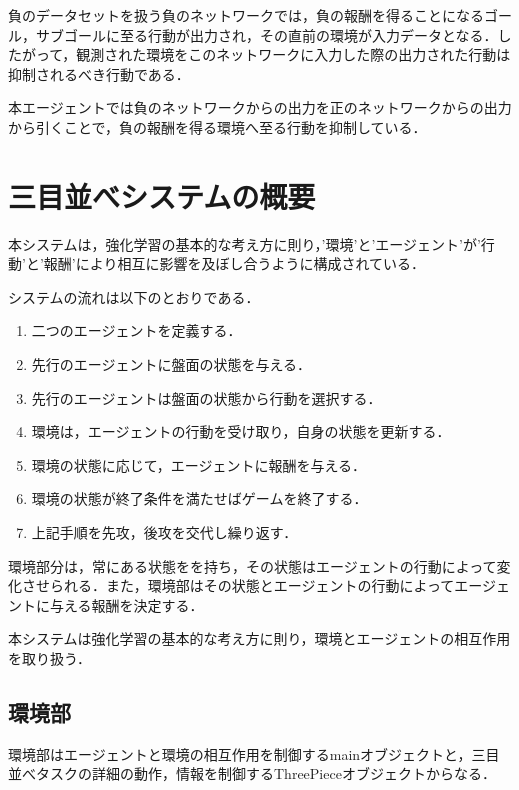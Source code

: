 負のデータセットを扱う負のネットワークでは，負の報酬を得ることになるゴール，サブゴールに至る行動が出力され，その直前の環境が入力データとなる．したがって，観測された環境をこのネットワークに入力した際の出力された行動は抑制されるべき行動である．

本エージェントでは負のネットワークからの出力を正のネットワークからの出力から引くことで，負の報酬を得る環境へ至る行動を抑制している．

\section{三目並べシステムの概要}

本システムは，強化学習の基本的な考え方に則り，'環境'と'エージェント'が'行動'と'報酬'により相互に影響を及ぼし合うように構成されている．

システムの流れは以下のとおりである．

\begin{enumerate}
  \item 二つのエージェントを定義する．
  \item 先行のエージェントに盤面の状態を与える．
  \item 先行のエージェントは盤面の状態から行動を選択する．
  \item 環境は，エージェントの行動を受け取り，自身の状態を更新する．
  \item 環境の状態に応じて，エージェントに報酬を与える．
  \item 環境の状態が終了条件を満たせばゲームを終了する．
  \item 上記手順を先攻，後攻を交代し繰り返す．
\end{enumerate}



環境部分は，常にある状態をを持ち，その状態はエージェントの行動によって変化させられる．また，環境部はその状態とエージェントの行動によってエージェントに与える報酬を決定する．

本システムは強化学習の基本的な考え方に則り，環境とエージェントの相互作用を取り扱う．

\subsection{環境部}
環境部はエージェントと環境の相互作用を制御するmainオブジェクトと，三目並べタスクの詳細の動作，情報を制御するThreePieceオブジェクトからなる．

